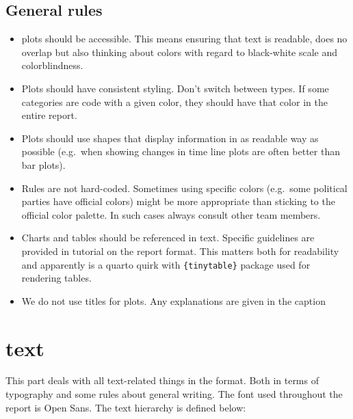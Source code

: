 \documentclass[
  letterpaper,
  DIV=11,
  numbers=noendperiod]{scrreprt}
\begin{document}
\section{General rules}\label{general-rules}

\begin{itemize}
\item
  plots should be accessible. This means ensuring that text is readable,
  does no overlap but also thinking about colors with regard to
  black-white scale and colorblindness.
\item
  Plots should have consistent styling. Don't switch between types. If
  some categories are code with a given color, they should have that
  color in the entire report.
\item
  Plots should use shapes that display information in as readable way as
  possible (e.g.~when showing changes in time line plots are often
  better than bar plots).
\item
  Rules are not hard-coded. Sometimes using specific colors (e.g.~some
  political parties have official colors) might be more appropriate than
  sticking to the official color palette. In such cases always consult
  other team members.
\item
  Charts and tables should be referenced in text. Specific guidelines
  are provided in tutorial on the report format. This matters both for
  readability and apparently is a quarto quirk with
  \texttt{\{tinytable\}} package used for rendering tables.
\item
  We do not use titles for plots. Any explanations are given in the
  caption
\end{itemize}


\chapter{text}\label{text}

This part deals with all text-related things in the format. Both in
terms of typography and some rules about general writing. The font used
throughout the report is Open Sans. The text hierarchy is defined below:
\end{document}
